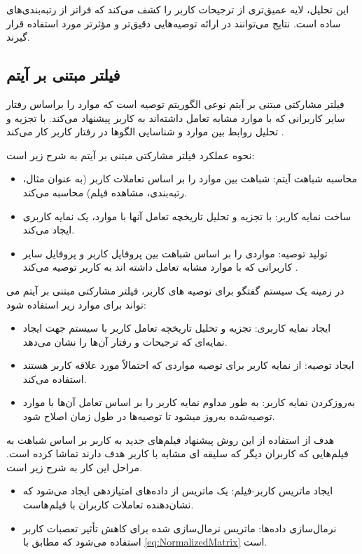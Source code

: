 \begin{enumerate}
\begin{itemize}
\end{itemize}

این تحلیل، لایه عمیق‌تری از ترجیحات کاربر را کشف می‌کند که فراتر از رتبه‌بندی‌های ساده است. نتایج می‌توانند در ارائه توصیه‌هایی دقیق‌تر و مؤثرتر مورد استفاده قرار گیرند.

\subsection{فیلتر مبتنی بر آیتم}


فیلتر مشارکتی مبتنی بر آیتم%
 نوعی الگوریتم توصیه است که موارد را براساس رفتار سایر کاربرانی که با موارد مشابه تعامل داشته‌اند به کاربر پیشنهاد می‌کند. با تجزیه و تحلیل روابط بین موارد و شناسایی الگوها در رفتار کاربر کار می‌کند %
\cite{abdalla2023boosting}
.

نحوه عملکرد فیلتر مشارکتی مبتنی بر آیتم به شرح زیر است:
\begin{itemize}
\item
محاسبه شباهت آیتم: شباهت بین موارد را بر اساس تعاملات کاربر (به عنوان مثال، رتبه‌بندی، مشاهده فیلم) محاسبه می‌کند.
\item
ساخت نمایه کاربر: با تجزیه و تحلیل تاریخچه تعامل آنها با موارد، یک نمایه کاربری ایجاد می‌کند.
\item
تولید توصیه: مواردی را بر اساس شباهت بین پروفایل کاربر و پروفایل سایر کاربرانی که با موارد مشابه تعامل داشته اند به کاربر توصیه می‌کند
\cite{dwivedi2023item}
.

\end{itemize}


در زمینه یک سیستم گفتگو برای توصیه های کاربر، فیلتر مشارکتی مبتنی بر آیتم می تواند برای موارد زیر استفاده شود:
\begin{itemize}
\item
ایجاد نمایه کاربری:  تجزیه و تحلیل تاریخچه تعامل کاربر با سیستم جهت ایجاد نمایه‌ای که ترجیحات و رفتار آن‌ها را نشان می‌دهد.
\item
ایجاد توصیه: از نمایه کاربر برای توصیه مواردی که احتمالاً مورد علاقه کاربر هستند استفاده می‌کند.
\item
به‌روزکردن نمایه کاربر: به طور مداوم نمایه کاربر را بر اساس تعامل آن‌ها با موارد توصیه‌شده به‌روز میشود تا توصیه‌ها در طول زمان اصلاح شود.
\end{itemize}

هدف از استفاده از این روش  پیشنهاد فیلم‌های جدید به کاربر بر اساس شباهت به فیلم‌هایی که کاربران دیگر که سلیقه ای مشابه با کاربر هدف دارند تماشا کرده است. مراحل این کار به شرح زیر است.
\begin{itemize}
\item
ایجاد ماتریس کاربر-فیلم:  یک ماتریس از داده‌های امتیازدهی ایجاد می‌شود که نشان‌دهنده تعاملات کاربران با فیلم‌هاست.
\item
نرمال‌سازی داده‌ها: ماتریس نرمال‌سازی شده برای کاهش تأثیر تعصبات کاربر استفاده می‌شود که مطابق با 
\ref{eq:NormalizedMatrix}
 است.


\end{itemize}
\end{enumerate}
